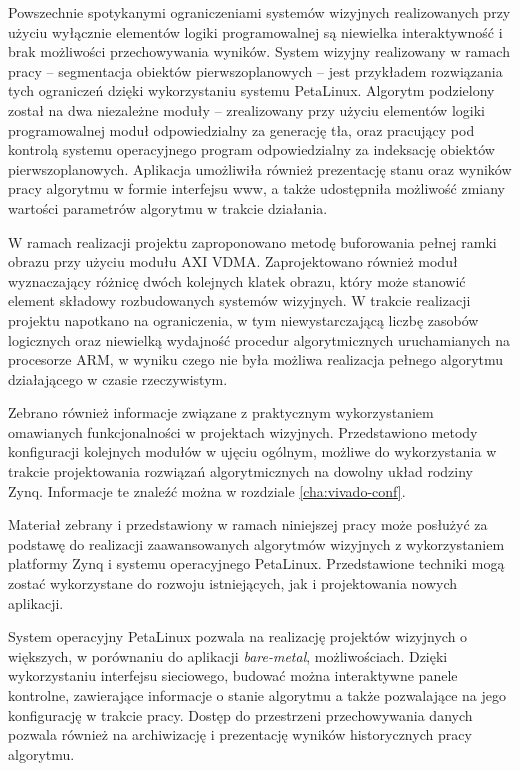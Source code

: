 Powszechnie spotykanymi ograniczeniami systemów wizyjnych realizowanych przy użyciu wyłącznie elementów logiki programowalnej są niewielka interaktywność i brak możliwości przechowywania wyników. System wizyjny realizowany w ramach pracy -- segmentacja obiektów pierwszoplanowych -- jest przykładem rozwiązania tych ograniczeń dzięki wykorzystaniu systemu PetaLinux. Algorytm podzielony został na dwa niezależne moduły -- zrealizowany przy użyciu elementów logiki programowalnej moduł odpowiedzialny za generację tła, oraz pracujący pod kontrolą systemu operacyjnego program odpowiedzialny za indeksację obiektów pierwszoplanowych. Aplikacja umożliwiła również prezentację stanu oraz wyników pracy algorytmu w formie interfejsu www, a także udostępniła możliwość zmiany wartości parametrów algorytmu w trakcie działania.

W ramach realizacji projektu zaproponowano metodę buforowania pełnej ramki obrazu przy użyciu modułu AXI VDMA. 
Zaprojektowano również moduł wyznaczający różnicę dwóch kolejnych klatek obrazu, który może stanowić element składowy rozbudowanych systemów wizyjnych.
W trakcie realizacji projektu napotkano na ograniczenia, w tym niewystarczającą liczbę zasobów logicznych oraz niewielką wydajność procedur algorytmicznych uruchamianych na procesorze ARM, w wyniku czego nie była możliwa realizacja pełnego algorytmu działającego w czasie rzeczywistym.

Zebrano również informacje związane z praktycznym wykorzystaniem omawianych funkcjonalności w projektach wizyjnych. 
Przedstawiono metody konfiguracji kolejnych modułów w ujęciu ogólnym, możliwe do wykorzystania w trakcie projektowania rozwiązań algorytmicznych na dowolny układ rodziny Zynq. 
Informacje te znaleźć można w rozdziale \ref{cha:vivado-conf}.

Materiał zebrany i przedstawiony w ramach niniejszej pracy może posłużyć za podstawę do realizacji zaawansowanych algorytmów wizyjnych z wykorzystaniem platformy Zynq i systemu operacyjnego PetaLinux. 
Przedstawione techniki mogą zostać wykorzystane do rozwoju istniejących, jak i projektowania nowych aplikacji.

System operacyjny PetaLinux pozwala na realizację projektów wizyjnych o większych, w porównaniu do aplikacji \emph{bare-metal}, możliwościach. Dzięki wykorzystaniu interfejsu sieciowego, budować można interaktywne panele kontrolne, zawierające informacje o stanie algorytmu a także pozwalające na jego konfigurację w trakcie pracy. Dostęp do przestrzeni przechowywania danych pozwala również na archiwizację i prezentację wyników historycznych pracy algorytmu.

